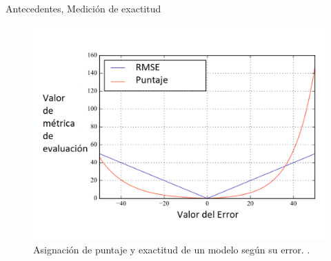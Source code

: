 \begin{frame}{Antecedentes, Medición de exactitud}
    \begin{figure}
        \centering
        \includegraphics[scale=0.3]{animate/error_metricas_evaluacion.png}
        \caption{Asignación de puntaje y exactitud de un modelo según su error. \cite{metricas-rmse}.}
        \label{fig:rmse-score}
    \end{figure}
\end{frame}

